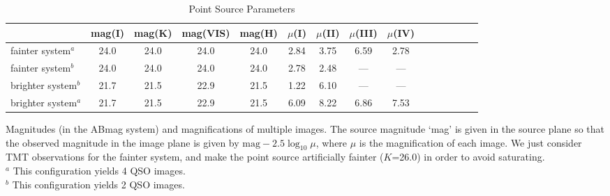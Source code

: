 \documentclass[a4paper,11pt]{article}
\begin{document}
\begin{table}\footnotesize
\begin{center}
\caption{Point Source Parameters}
\begin{tabular}{lcccccccccccccc|}
\hline \hline
&  mag(I) &  mag(K) &  mag(VIS) & mag(H) & $\mu$(I) & $\mu$(II) & $\mu$(III) & $\mu$(IV) \\
\hline
fainter system$^a$   &24.0  &   24.0 &  24.0 &  24.0 &  2.84 &  3.75 & 6.59 & 2.78  \\
fainter system$^b$   &24.0  &  24.0  &  24.0 &  24.0 &  2.78 &  2.48 &  ---   &  ---\\
brighter system$^b$ &21.7  &  21.5 &  22.9  & 21.5  & 1.22  & 6.10  & ---   &  ---\\
brighter system$^a$ &21.7  &  21.5 & 22.9  &  21.5  & 6.09  & 8.22 & 6.86  & 7.53\\
\hline
\hline
\end{tabular}
\begin{tablenotes}
\item
Magnitudes (in the ABmag system) and magnifications of multiple images.
 The source magnitude `mag' is given in the source plane so that the observed magnitude in the image plane is given by
  $\mathrm{mag}-2.5\log_{10} \mu$, where $\mu$ is the magnification of each image. We just consider TMT observations for the fainter system, and make the point source artificially fainter ($K$=26.0) in order to avoid saturating.\\
$^a$ This configuration yields 4 QSO images. \\
$^b$ This configuration yields 2 QSO images. \\
\label{tab:pointsource}
\end{tablenotes}
\end{center}
\end{table}
\end{document}
